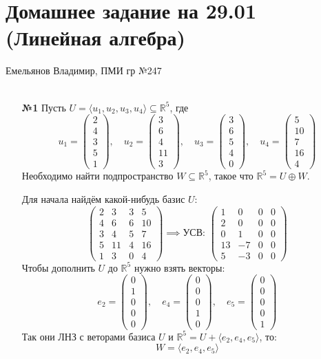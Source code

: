 \documentclass[a4paper]{article}
\newcommand{\mat}[1]{\begin{pmatrix} #1 \end{pmatrix}}
\newcommand{\RR}{\mathbb{R}}
\begin{document}
\section*{Домашнее задание на 29.01 (Линейная алгебра)}
 {\large Емельянов Владимир, ПМИ гр №247}\\\\
\begin{enumerate}
    \item[\textbf{№1}]Пусть $ U = \langle u_{1}, u_{2}, u_{3}, u_{4} \rangle \subseteq \mathbb{R}^{5} $, где
    $$
    u_{1} = \mat{2\\ 4\\ 3\\ 5\\ 1}, \quad u_{2} = \mat{3\\6\\ 4\\ 11\\ 3}, \quad u_{3} = \mat{3\\6\\ 5\\ 4\\ 0}, \quad u_{4} = \mat{5\\ 10\\ 7\\ 16\\4}
    $$
    Необходимо найти подпространство $ W \subseteq \mathbb{R}^{5} $, такое что $ \mathbb{R}^{5} = U \oplus W $.

    Для начала найдём какой-нибудь базис $U$:
    $$\mat{2 & 3 & 3 & 5\\ 4 & 6 & 6 & 10\\ 3 & 4 & 5 &7\\ 5&11&4&16\\ 1&3&0&4} \implies \text{УСВ: } \mat{1 & 0 & 0 & 0 \\
    2 & 0 & 0 & 0 \\
    0 & 1 & 0 & 0 \\
    13 & -7 & 0 & 0 \\
    5 & -3 & 0 & 0}
    $$
    Чтобы дополнить $U$ до $\RR^5$ нужно взять векторы:
    $$e_2 = \mat{0\\1\\0\\0\\0}, \quad e_4 = \mat{0\\0\\0\\1\\0}, \quad e_5 = \mat{0\\0\\0\\0\\1}$$
    Так они ЛНЗ с веторами базиса $U$ и $\RR^5 = U + \langle e_2, e_4, e_5\rangle$, то:
    $$W = \langle e_2, e_4, e_5\rangle$$


\end{enumerate}
\end{document}

